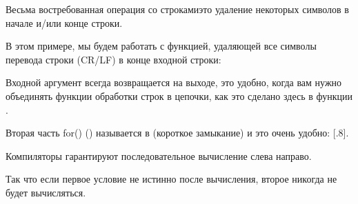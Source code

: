 \newcommand{\CRLF}{\ac{CR}/\ac{LF}}

Весьма востребованная операция со строками\EMDASH{}это удаление некоторых символов в начале и/или конце
строки.

В этом примере, мы будем работать с функцией, удаляющей все символы перевода строки 
(\CRLF{}) в конце входной строки:



Входной аргумент всегда возвращается на выходе, это удобно, когда вам нужно объединять
функции обработки строк в цепочки, как это сделано здесь в функции \main.

Вторая часть for() () называется в \CCpp {} 
(короткое замыкание) и это очень удобно: [.8].

Компиляторы \CCpp гарантируют последовательное вычисление слева направо.

Так что если первое условие не истинно после вычисления, второе никогда не будет
вычисляться.






